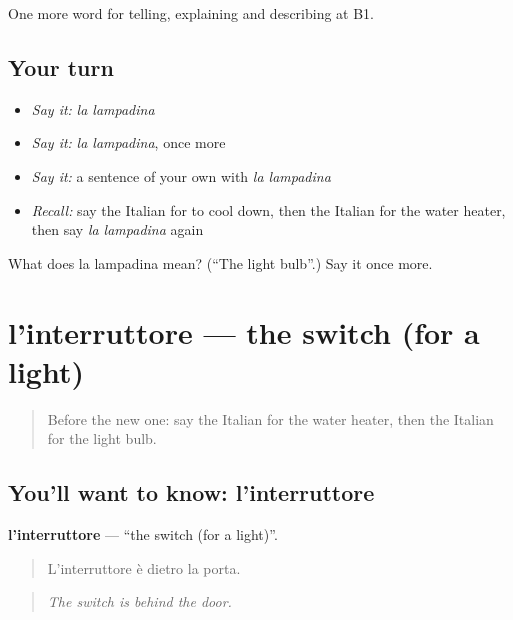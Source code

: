 \begin{grammarlens}[title={What you've built}]
One more word for telling, explaining and describing at B1.
\end{grammarlens}

\subsection*{Your turn}
\begin{itemize}
\raggedright
  \item \emph{Say it:} \emph{la lampadina}
  \item \emph{Say it:} \emph{la lampadina}, once more
  \item \emph{Say it:} a sentence of your own with \emph{la lampadina}
  \item \emph{Recall:} say the Italian for to cool down, then the Italian for the water heater, then say \emph{la lampadina} again
\end{itemize}

\begin{tcolorbox}[breakable,colback=teal!4,colframe=teal!35!black,title={Before you move on}]
What does la lampadina mean? (\textquotedblleft{}The light bulb\textquotedblright{}.) Say it once more.
\end{tcolorbox}
\section[l'interruttore]{l'interruttore — the switch (for a light)}

\label{lesson:IT-C436-interruttore}



\begin{quote}
Before the new one: say the Italian for the water heater, then the Italian for the light bulb.
\end{quote}

\subsection*{You'll want to know: l'interruttore}
\textbf{l'interruttore} — \textquotedblleft{}the switch (for a light)\textquotedblright{}.

\begin{quote}
L'interruttore è dietro la porta.
\end{quote}

\begin{quote}
\emph{The switch is behind the door.}
\end{quote}

